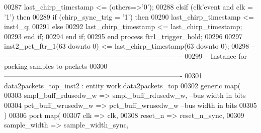 \begin{DoxyCode}
00287             \textcolor{vhdlchar}{last_chirp_timestamp} \textcolor{vhdlchar}{<=} \textcolor{vhdlchar}{(}\textcolor{keywordflow}{others}\textcolor{vhdlchar}{=}\textcolor{vhdlchar}{>}\textcolor{vhdlchar}{'}\textcolor{vhdllogic}{}\textcolor{vhdllogic}{0}\textcolor{vhdlchar}{'}\textcolor{vhdlchar}{)};         
00288         \textcolor{keywordflow}{elsif} \textcolor{vhdlchar}{(}\textcolor{vhdlchar}{clk}\textcolor{vhdlchar}{'}\textcolor{vhdlkeyword}{event} \textcolor{keywordflow}{and} \textcolor{vhdlchar}{clk} \textcolor{vhdlchar}{=} \textcolor{vhdlchar}{'}\textcolor{vhdllogic}{}\textcolor{vhdllogic}{1}\textcolor{vhdlchar}{'}\textcolor{vhdlchar}{)} \textcolor{keywordflow}{then}
00289             \textcolor{keywordflow}{if} \textcolor{vhdlchar}{(}\textcolor{vhdlchar}{chirp_sync_trig} \textcolor{vhdlchar}{=} \textcolor{vhdlchar}{'}\textcolor{vhdllogic}{}\textcolor{vhdllogic}{1}\textcolor{vhdlchar}{'}\textcolor{vhdlchar}{)} \textcolor{keywordflow}{then}
00290             \textcolor{vhdlchar}{last_chirp_timestamp} \textcolor{vhdlchar}{<=} \textcolor{vhdlchar}{inst4_q};
00291             \textcolor{keywordflow}{else}
00292             \textcolor{vhdlchar}{last_chirp_timestamp} \textcolor{vhdlchar}{<=} \textcolor{vhdlchar}{last_chirp_timestamp};
00293             \textcolor{keywordflow}{end} \textcolor{keywordflow}{if};
00294      \textcolor{keywordflow}{end} \textcolor{keywordflow}{if};
00295     \textcolor{keywordflow}{end} \textcolor{keywordflow}{process} \textcolor{vhdlchar}{ftr1\_trigger\_hold};
00296 
00297   inst2\_pct\_ftr\_1(\textcolor{vhdllogic}{63} \textcolor{keywordflow}{downto} \textcolor{vhdllogic}{0})  <= last\_chirp\_timestamp(\textcolor{vhdllogic}{63} \textcolor{keywordflow}{downto} \textcolor{vhdllogic}{0});
00298 \textcolor{keyword}{-- ----------------------------------------------------------------------------}
00299 \textcolor{keyword}{-- Instance for packing samples to packets}
00300 \textcolor{keyword}{-- ----------------------------------------------------------------------------       }
00301 data2packets\_top\_inst2 : \textcolor{keywordflow}{entity} work.data2packets_top
00302    \textcolor{keywordflow}{generic} \textcolor{keywordflow}{map}(
00303       smpl_buff_rdusedw_w => smpl_buff_rdusedw_w,\textcolor{keyword}{  --bus width in bits }
00304       pct_buff_wrusedw_w  => pct_buff_wrusedw_w    \textcolor{keyword}{--bus width in bits            }
00305    \textcolor{vhdlchar}{)}
00306    \textcolor{keywordflow}{port} \textcolor{keywordflow}{map}(
00307       clk               => clk,
00308       reset_n           => reset_n_sync,
00309       sample_width      => sample_width_sync,

\end{DoxyCode}
